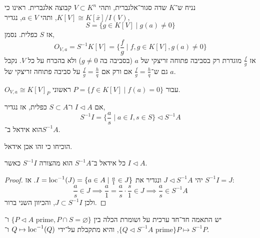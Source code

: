 \begin{example}
	נניח ש־$K$ שדה סגור־אלגברית, ותהי $V \subset K^n$ קבוצה אלגברית.
	ראינו כי $K[V] \cong K[\bar{x}] / I(V)$, ותהי $a \in V$, נגדיר,
	\[
		S
		= \{ g \in K[V] \mid g(a) \ne 0 \}
	\]
	אז $S$ כפלית.
	נסמן,
	\[
		O_{V, a}
		= S^{-1} K[V]
		= \{ \frac{f}{g} \mid f, g \in K[V], g(a) \ne 0 \}
	\]
	אז $\frac{f}{g}$ מוגדרת רק בסביבה פתוחה זריצקי של $a$ (בסביבה בה $g \ne 0$) ולא בהכרח על כל $V$.
	נקבל גם ש־$\frac{f}{g} = \frac{h}{q}$ אם ורק אם $\frac{f}{g} = \frac{h}{q}$ על סביבה פתוחה זריצקי של $a$.
\end{example}
\begin{remark}
	$O_{V, a} \cong {K[V]}_P$ עבור $P = \{ f \in K[V] \mid f(a) = 0 \}$ ראשוני.
\end{remark}
\begin{definition}
	אם $I \triangleleft A$ ו־$S \subset A$ כפלית, אז נגדיר,
	\[
		S^{-1} I
		= \{ \frac{a}{s} \mid a \in I, s \in S \}
		\triangleleft S^{-1} A
	\]
	הוא אידאל ב־$S^{-1} A$.
\end{definition}
\begin{exercise}
	הוכיחו כי זהו אכן אידאל.
\end{exercise}
\begin{proposition}
	כל אידאל ב־$S^{-1} A$ הוא מהצורה $S^{-1} I$ כאשר $I \triangleleft A$.
\end{proposition}
\begin{proof}
	יהי $J \triangleleft S^{-1} A$ ונגדיר את $I = \operatorname{loc}^{-1}(J) = \{ a \in A \mid \frac{a}{1} \in J \}$.
	אז $S^{-1} I = J$:
	\[
		\frac{a}{s} \in J
		\implies
		\frac{a}{1} = \frac{a}{s} \cdot \frac{s}{1} \in J
		\implies \frac{a}{s} \in S^{-1} A
	\]
	ולכן $J \subset S^{-1} I$, והכיוון השני ברור.
\end{proof}
\begin{proposition}
	יש התאמה חד־חד ערכית על ושומרת הכלה בין $\{ P \triangleleft A \text{ prime}, P \cap S = \varnothing \}$ ו־$\{ Q \triangleleft S^{-1} A \text{ prime} \}$,
	והיא מתקבלת על־ידי $Q \mapsto \operatorname{loc}^{-1}(Q)$ ו־$P \mapsto S^{-1} P$.
\end{proposition}
